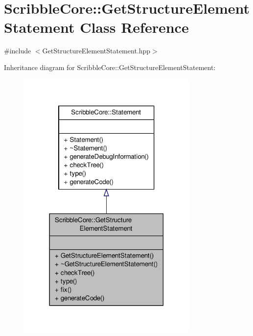 \hypertarget{class_scribble_core_1_1_get_structure_element_statement}{\section{Scribble\-Core\-:\-:Get\-Structure\-Element\-Statement Class Reference}
\label{class_scribble_core_1_1_get_structure_element_statement}
}


{\ttfamily \#include $<$Get\-Structure\-Element\-Statement.\-hpp$>$}



Inheritance diagram for Scribble\-Core\-:\-:Get\-Structure\-Element\-Statement\-:
\nopagebreak
\begin{figure}[H]
\begin{center}
\leavevmode
\includegraphics[width=254pt]{class_scribble_core_1_1_get_structure_element_statement__inherit__graph}
\end{center}
\end{figure}


